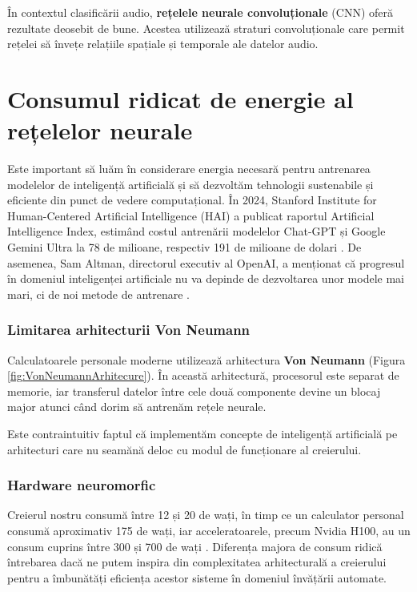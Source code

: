 În contextul clasificării audio, \textbf{rețelele neurale convoluționale} (CNN) oferă rezultate deosebit de bune. Acestea 
utilizează straturi convoluționale care permit rețelei să învețe relațiile spațiale și temporale ale datelor audio.

\section{Consumul ridicat de energie al rețelelor neurale}

Este important să luăm în considerare energia necesară pentru antrenarea 
modelelor de inteligență artificială și să dezvoltăm tehnologii sustenabile și 
eficiente din punct de vedere computațional. În 2024, Stanford Institute for 
Human-Centered Artificial Intelligence (HAI) a publicat raportul Artificial 
Intelligence Index, estimând costul antrenării modelelor Chat-GPT și Google 
Gemini Ultra la 78 de milioane, respectiv 191 de milioane de dolari 
\cite{HAI_2024_AI-Index-Report}. De asemenea, Sam Altman, directorul executiv al 
OpenAI, a menționat că progresul în domeniul inteligenței artificiale nu va 
depinde de dezvoltarea unor modele mai mari, ci de noi metode de antrenare 
\cite{wired-sam-altman}.


\subsubsection{Limitarea arhitecturii Von Neumann}

Calculatoarele personale moderne utilizează arhitectura \textbf{Von Neumann} (Figura \ref{fig:VonNeumannArhitecure}). În 
această arhitectură, procesorul este 
separat de memorie, iar transferul datelor între cele două componente devine un blocaj major atunci când dorim să antrenăm 
rețele neurale. 

Este contraintuitiv faptul că implementăm concepte de inteligență artificială pe arhitecturi care nu seamănă deloc cu modul de 
funcționare al creierului. 


\subsubsection{Hardware neuromorfic}

Creierul nostru consumă între 12 și 20 de wați, în timp ce un calculator personal consumă aproximativ 175 de wați, iar acceleratoarele, precum Nvidia H100, au un consum cuprins între 300 și 700 de wați \cite{WhyBrainLikeComputersAreHard}. Diferența majora de consum ridică întrebarea dacă ne putem inspira din complexitatea arhitecturală a creierului pentru a îmbunătăți eficiența acestor sisteme în domeniul învățării automate.

